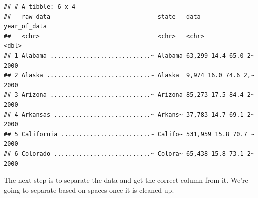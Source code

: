 \documentclass[
]{book}
\newenvironment{Shaded}{\begin{snugshade}}{\end{snugshade}}
\newcommand{\CharTok}[1]{\textcolor[rgb]{0.31,0.60,0.02}{#1}}
\newcommand{\DataTypeTok}[1]{\textcolor[rgb]{0.13,0.29,0.53}{#1}}
\newcommand{\KeywordTok}[1]{\textcolor[rgb]{0.13,0.29,0.53}{\textbf{#1}}}
\newcommand{\NormalTok}[1]{#1}
\newcommand{\OperatorTok}[1]{\textcolor[rgb]{0.81,0.36,0.00}{\textbf{#1}}}
\newcommand{\StringTok}[1]{\textcolor[rgb]{0.31,0.60,0.02}{#1}}
\begin{document}
\begin{Shaded}
\end{Shaded}

\begin{verbatim}
## # A tibble: 6 x 4
##   raw_data                              state   data                year_of_data
##   <chr>                                 <chr>   <chr>                      <dbl>
## 1 Alabama ............................~ Alabama 63,299 14.4 65.0 2~         2000
## 2 Alaska .............................~ Alaska  9,974 16.0 74.6 2,~         2000
## 3 Arizona ............................~ Arizona 85,273 17.5 84.4 2~         2000
## 4 Arkansas ...........................~ Arkans~ 37,783 14.7 69.1 2~         2000
## 5 California .........................~ Califo~ 531,959 15.8 70.7 ~         2000
## 6 Colorado ...........................~ Colora~ 65,438 15.8 73.1 2~         2000
\end{verbatim}

The next step is to separate the data and get the correct column from it. We're going to separate based on spaces once it is cleaned up.
\end{document}
